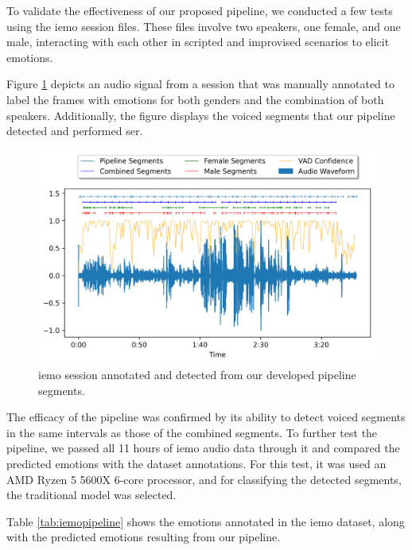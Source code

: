 To validate the effectiveness of our proposed pipeline, we conducted a few tests using the \ac{iemo} session files. These files involve two speakers, one female, and one male, interacting with each other in scripted and improvised scenarios to elicit emotions.

Figure \ref{fig:iemo_pipeline} depicts an audio signal from a session that was manually annotated to label the frames with emotions for both genders and the combination of both speakers. Additionally, the figure displays the voiced segments that our pipeline detected and performed \ac{ser}.

\begin{figure}[H]
	\centering
	\includegraphics[width=\textwidth]{figs/6_video_conf_ser/pipeline.png}
	\caption{\ac{iemo} session annotated and detected from our developed pipeline segments.}
	\label{fig:iemo_pipeline}
\end{figure}

The efficacy of the pipeline was confirmed by its ability to detect voiced segments in the same intervals as those of the combined segments. To further test the pipeline, we passed all 11 hours of \ac{iemo} audio data through it and compared the predicted emotions with the dataset annotations. For this test, it was used an AMD Ryzen 5 5600X 6-core processor, and for classifying the detected segments, the traditional model was selected.

Table \ref{tab:iemopipeline} shows the emotions annotated in the \ac{iemo} dataset, along with the predicted emotions resulting from our pipeline.

